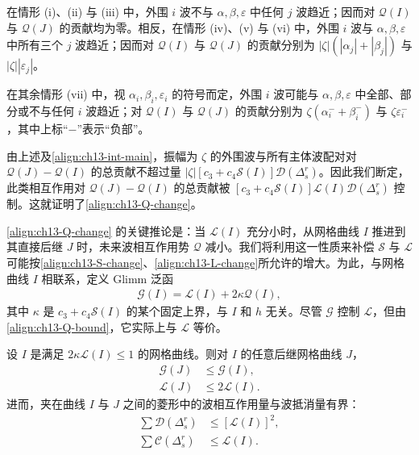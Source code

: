 \documentclass[../../main.tex]{subfiles}
\begin{document}
在情形 (i)、(ii) 与 (iii) 中，外围 $i$ 波不与 $\alpha,\beta,\varepsilon$ 中任何 $j$ 波趋近；因而对 $\mathscr{Q}(I)$ 与 $\mathscr{Q}(J)$ 的贡献均为零。相反，在情形 (iv)、(v) 与 (vi) 中，外围 $i$ 波与 $\alpha,\beta,\varepsilon$ 中所有三个 $j$ 波趋近；因而对 $\mathscr{Q}(I)$ 与 $\mathscr{Q}(J)$ 的贡献分别为 $|\zeta|(|\alpha_j|+|\beta_j|)$ 与 $|\zeta||\varepsilon_j|$。

在其余情形 (vii) 中，视 $\alpha_i,\beta_i,\varepsilon_i$ 的符号而定，外围 $i$ 波可能与 $\alpha,\beta,\varepsilon$ 中全部、部分或不与任何 $i$ 波趋近；对 $\mathscr{Q}(I)$ 与 $\mathscr{Q}(J)$ 的贡献分别为 $\zeta(\alpha_i^-+\beta_i^-)$ 与 $\zeta\varepsilon_i^-$，其中上标``$-$''表示``负部''。

由上述及\eqref{align:ch13-int-main}，振幅为 $\zeta$ 的外围波与所有主体波配对对 $\mathscr{Q}(J)-\mathscr{Q}(I)$ 的总贡献不超过量 $|\zeta|[c_3+c_4\mathscr{S}(I)]\mathscr{D}(\Delta_s^r)$。因此我们断定，此类相互作用对 $\mathscr{Q}(J)-\mathscr{Q}(I)$ 的总贡献被 $[c_3+c_4\mathscr{S}(I)]\mathscr{L}(I)\mathscr{D}(\Delta_s^r)$ 控制。这就证明了\eqref{align:ch13-Q-change}。

\eqref{align:ch13-Q-change} 的关键推论是：当 $\mathscr{L}(I)$ 充分小时，从网格曲线 $I$ 推进到其直接后继 $J$ 时，未来波相互作用势 $\mathscr{Q}$ 减小。我们将利用这一性质来补偿 $\mathscr{S}$ 与 $\mathscr{L}$ 可能按\eqref{align:ch13-S-change}、\eqref{align:ch13-L-change}所允许的增大。为此，与网格曲线 $I$ 相联系，定义 Glimm 泛函
\begin{align}
\mathscr{G}(I)=\mathscr{L}(I)+2\kappa\mathscr{Q}(I),
\label{align:ch13-G-def}
\end{align}
其中 $\kappa$ 是 $c_3+c_4\mathscr{S}(I)$ 的某个固定上界，与 $I$ 和 $h$ 无关。尽管 $\mathscr{G}$ 控制 $\mathscr{L}$，但由\eqref{align:ch13-Q-bound}，它实际上与 $\mathscr{L}$ 等价。

\begin{theorem}\label{theorem:ch13-glimm递减}
设 $I$ 是满足 $2\kappa\mathscr{L}(I)\leqslant1$ 的网格曲线。则对 $I$ 的任意后继网格曲线 $J$，
\begin{align}
\mathscr{G}(J)&\leqslant\mathscr{G}(I),\label{align:ch13-G-dec}\\
\mathscr{L}(J)&\leqslant2\mathscr{L}(I).
\label{align:ch13-L-double}
\end{align}
进而，夹在曲线 $I$ 与 $J$ 之间的菱形中的波相互作用量与波抵消量有界：
\begin{align}
\sum\mathscr{D}(\Delta_s^r)&\leqslant[\mathscr{L}(I)]^2,\label{align:ch13-D-sum}\\
\sum\mathscr{C}(\Delta_s^r)&\leqslant\mathscr{L}(I).
\label{align:ch13-C-sum}
\end{align}
\end{theorem}
\end{document}
